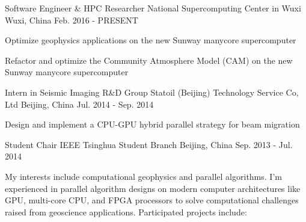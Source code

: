 \documentclass[11pt, a4paper]{awesome-cv}
\begin{document}
\begin{cventries}

  \cventry
    {Software Engineer \& HPC Researcher} %
    {National Supercomputing Center in Wuxi} %
    {Wuxi, China} %
    {Feb. 2016 - PRESENT} %
    {
      \begin{cvitems} %
        \item {Optimize geophysics applications on the new Sunway manycore supercomputer}
        \item {Refactor and optimize the Community Atmosphere Model (CAM) on the new Sunway manycore supercomputer}
      \end{cvitems}
    }

  \cventry
    {Intern in Seismic Imaging R\&D Group} %
    {Statoil (Beijing) Technology Service Co, Ltd} %
    {Beijing, China} %
    {Jul. 2014 - Sep. 2014} %
    {
      \begin{cvitems} %
        \item {Design and implement a CPU-GPU hybrid parallel strategy for beam migration}
      \end{cvitems}
    }

  \cventry
    {Student Chair} %
    {IEEE Tsinghua Student Branch} %
    {Beijing, China} %
    {Sep. 2013 - Jul. 2014} %
    {
    }

\end{cventries}



\begin{cvparagraph}
My interests include computational geophysics and parallel algorithms. I'm experienced in parallel algorithm designs on modern computer architectures like GPU, multi-core CPU, and FPGA processors to solve computational challenges raised from geoscience applications. Participated projects include:
\end{cvparagraph}
\end{document}
